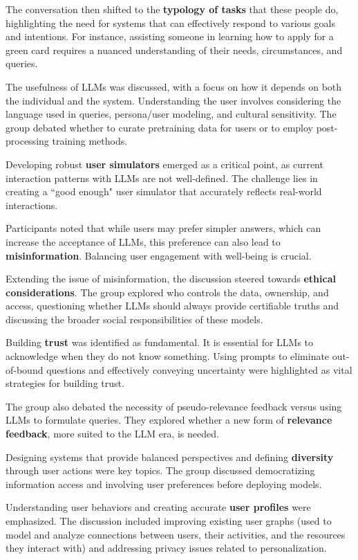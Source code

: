 \documentclass[11pt,dvipdfm]{article}
\begin{document}
The conversation then shifted to the {\bf typology of tasks} that these people do, highlighting the need for systems that can effectively respond to various goals and intentions. For instance, assisting someone in learning how to apply for a green card requires a nuanced understanding of their needs, circumstances, and queries.

The usefulness of LLMs was discussed, with a focus on how it depends on both the individual and the system. Understanding the user involves considering the language used in queries, persona/user modeling, and cultural sensitivity. The group debated whether to curate pretraining data for users or to employ post-processing training methods.

Developing robust {\bf user simulators} emerged as a critical point, as current interaction patterns with LLMs are not well-defined. The challenge lies in creating a ``good enough" user simulator that accurately reflects real-world interactions.

Participants noted that while users may prefer simpler answers, which can increase the acceptance of LLMs, this preference can also lead to {\bf misinformation}. Balancing user engagement with well-being is crucial.

Extending the issue of misinformation, the discussion steered towards {\bf ethical considerations}. The group explored who controls the data, ownership, and access, questioning whether LLMs should always provide certifiable truths and discussing the broader social responsibilities of these models.

Building {\bf trust} was identified as fundamental. It is essential for LLMs to acknowledge when they do not know something. Using prompts to eliminate out-of-bound questions and effectively conveying uncertainty were highlighted as vital strategies for building trust.

The group also debated the necessity of pseudo-relevance feedback versus using LLMs to formulate queries. They explored whether a new form of {\bf relevance feedback}, more suited to the LLM era, is needed.

Designing systems that provide balanced perspectives and defining {\bf diversity} through user actions were key topics. The group discussed democratizing information access and involving user preferences before deploying models.

Understanding user behaviors and creating accurate {\bf user profiles} were emphasized. The discussion included improving existing user graphs (used to model and analyze connections between users, their activities, and the resources they interact with) and addressing privacy issues related to personalization.
\end{document}
